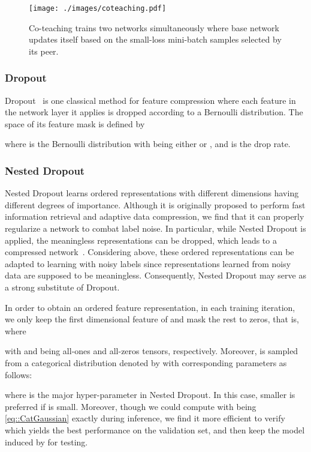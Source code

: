 \documentclass[journal]{IEEEtran}
\begin{document}
\begin{figure}[t]
	\begin{minipage}[t]{0.38\textwidth}  
		\centering  
		\texttt{[image: ./images/coteaching.pdf]}
	\end{minipage}  
	\centering  
	\caption{Co-teaching trains two networks simultaneously where base network updates itself based on the small-loss mini-batch samples selected by its peer.}
	\label{fig::coteaching}
	\vspace{-3mm}
\end{figure}

\subsubsection{Dropout}
Dropout~\cite{srivastava2014dropout} is one classical method for feature compression where each feature in the network layer it applies is dropped according to a Bernoulli distribution.
The space of its feature mask  is defined by
 
where  is the Bernoulli distribution with  being either  or , and  is the drop rate. 

\subsubsection{Nested Dropout}
Nested Dropout \cite{rippel2014learning} learns ordered representations with different dimensions having different degrees of importance.
Although it is originally proposed to perform fast information retrieval and adaptive data compression, we find that it can properly regularize a network to combat label noise.
In particular, while Nested Dropout is applied, the meaningless representations can be dropped, which leads to a compressed network~\cite{gomez2019learning}.
Considering above, these ordered representations can be adapted to learning with noisy labels since representations learned from noisy data are supposed to be meaningless. 
Consequently, Nested Dropout may serve as a strong substitute of Dropout.

In order to obtain an ordered feature representation, in each training iteration, we only keep the first  dimensional feature of  and mask the rest to zeros, that is,  where

with  and  being all-ones and all-zeros tensors, respectively.
Moreover,  is sampled from a categorical distribution denoted by  with corresponding parameters as follows:

where  is the major hyper-parameter in Nested Dropout.
In this case, smaller  is preferred if  is small.
Moreover, though we could compute  with  being \eqref{eq::CatGaussian} exactly during inference, we find it more efficient to verify which  yields the best performance on the validation set, and then keep the model induced by  for testing. 
\end{document}
